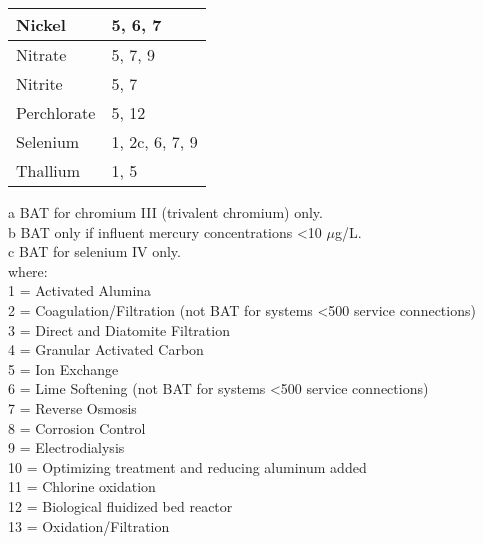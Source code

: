 \begin{table}[]
\begin{tabular}{|l|l|}
Nickel                                                 & 5, 6, 7                                                                         \\ \hline
Nitrate                                                & 5, 7, 9                                                                         \\ \hline
Nitrite                                                & 5, 7                                                                            \\ \hline
Perchlorate                                            & 5, 12                                                                           \\ \hline
Selenium                                               & 1, 2c, 6, 7, 9                                                                  \\ \hline
Thallium                                               & 1, 5                                                                            \\ \hline
\end{tabular}
\end{table}
a BAT for chromium III (trivalent chromium) only.\\
b BAT only if influent mercury concentrations <10 $\mu$g/L.\\
c BAT for selenium IV only.\\

where:\\
1 = Activated Alumina\\
2 = Coagulation/Filtration (not BAT for systems <500 service connections)\\
3 = Direct and Diatomite Filtration\\
4 = Granular Activated Carbon\\
5 = Ion Exchange\\
6 = Lime Softening (not BAT for systems <500 service connections)\\
7 = Reverse Osmosis\\
8 = Corrosion Control\\
9 = Electrodialysis\\
10 = Optimizing treatment and reducing aluminum added\\
11 = Chlorine oxidation\\
12 = Biological fluidized bed reactor\\
13 = Oxidation/Filtration\\

